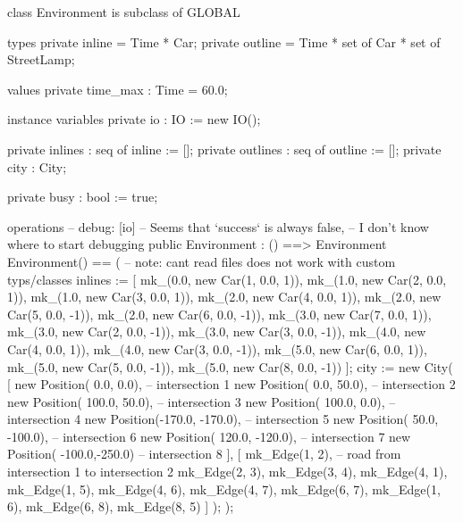 \documentclass[a4paper]{article}
\begin{document}
\title{}
\author{}
\begin{vdm_al}
class Environment is subclass of GLOBAL

types
    private inline = Time * Car;
    private outline = Time * set of Car * set of StreetLamp;

values
    private time_max : Time = 60.0;

instance variables
    private io : IO := new IO();

    private inlines : seq of inline := [];
    private outlines : seq of outline := [];
    private city : City;
    
    private busy : bool := true;

operations
    -- debug: [io]
    --        Seems that `success` is always false,
    --        I don't know where to start debugging
    public Environment : () ==> Environment
    Environment() == (
        -- note: cant read files does not work with custom typs/classes
        inlines := [
            mk_(0.0, new Car(1, 0.0,  1)),
            mk_(1.0, new Car(2, 0.0,  1)),
            mk_(1.0, new Car(3, 0.0,  1)),
            mk_(2.0, new Car(4, 0.0,  1)),
            mk_(2.0, new Car(5, 0.0, -1)),
            mk_(2.0, new Car(6, 0.0, -1)),
            mk_(3.0, new Car(7, 0.0,  1)),
            mk_(3.0, new Car(2, 0.0, -1)),
            mk_(3.0, new Car(3, 0.0, -1)),
            mk_(4.0, new Car(4, 0.0,  1)),
            mk_(4.0, new Car(3, 0.0, -1)),
            mk_(5.0, new Car(6, 0.0,  1)),
            mk_(5.0, new Car(5, 0.0, -1)),
            mk_(5.0, new Car(8, 0.0, -1))
        ];
        city := new City(
            [
                new Position(   0.0,    0.0), -- intersection 1
                new Position(   0.0,   50.0), -- intersection 2
                new Position( 100.0,   50.0), -- intersection 3
                new Position( 100.0,    0.0), -- intersection 4
                new Position(-170.0, -170.0), -- intersection 5
                new Position(  50.0, -100.0), -- intersection 6
                new Position( 120.0, -120.0), -- intersection 7
                new Position( -100.0,-250.0)  -- intersection 8
            ],
            [
                mk_Edge(1, 2), -- road from intersection 1 to intersection 2
                mk_Edge(2, 3),
                mk_Edge(3, 4),
                mk_Edge(4, 1),
                mk_Edge(1, 5),
                mk_Edge(4, 6),
                mk_Edge(4, 7),
                mk_Edge(6, 7),
                mk_Edge(1, 6),
                mk_Edge(6, 8),
                mk_Edge(8, 5)
            ]
        );
    );


\end{vdm_al}
\end{document}
